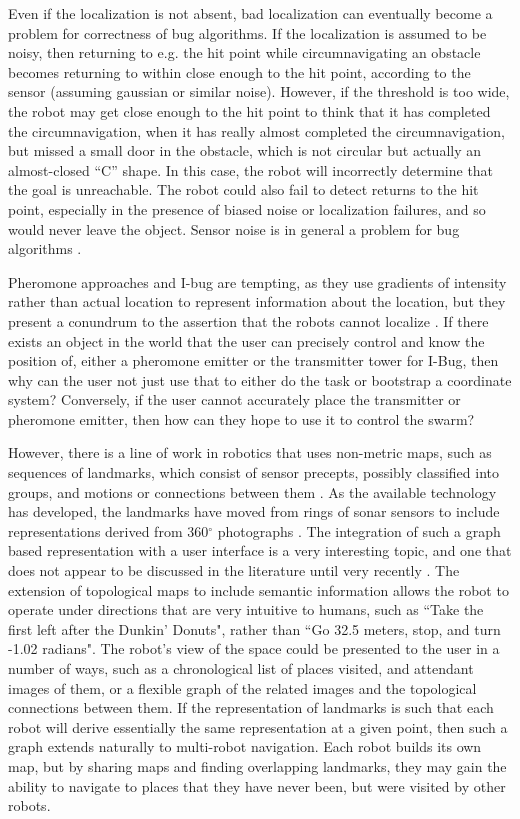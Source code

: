 Even if the localization is not absent, bad localization can eventually become a problem for correctness of bug algorithms. 
If the localization is assumed to be noisy, then returning to e.g. the hit point while circumnavigating an obstacle becomes returning to within close enough to the hit point, according to the sensor (assuming gaussian or similar noise). 
However, if the threshold is too wide, the robot may get close enough to the hit point to think that it has completed the circumnavigation, when it has really almost completed the circumnavigation, but missed a small door in the obstacle, which is not circular but actually an almost-closed ``C'' shape. 
In this case, the robot will incorrectly determine that the goal is unreachable. 
The robot could also fail to detect returns to the hit point, especially in the presence of biased noise or localization failures, and so would never leave the object. 
Sensor noise is in general a problem for bug algorithms \cite{ng2007performance}.

Pheromone approaches and I-bug are tempting, as they use gradients of intensity rather than actual location to represent information about the location, but they present a conundrum to the assertion that the robots cannot localize \citep{taylor2009bug}. 
If there exists an object in the world that the user can precisely control and know the position of, either a pheromone emitter or the transmitter tower for I-Bug, then why can the user not just use that to either do the task or bootstrap a coordinate system?
Conversely, if the user cannot accurately place the transmitter or pheromone emitter, then how can they hope to use it to control the swarm? 

However, there is a line of work in robotics that uses non-metric maps, such as sequences of landmarks, which consist of sensor precepts, possibly classified into groups, and motions or connections between them \citep{mataric1991navigating, franz1998learning}. 
As the available technology has developed, the landmarks have moved from rings of sonar sensors to include representations derived from 360$^\circ$ photographs \citep{tapus2005incremental, goedeme2007omnidirectional}. 
The integration of such a graph based representation with a user interface is a very interesting topic, and one that does not appear to be discussed in the literature until very recently \citep{landsiedel2018semantic}. 
The extension of topological maps to include semantic information allows the robot to operate under directions that are very intuitive to humans, such as ``Take the first left after the Dunkin' Donuts", rather than ``Go 32.5 meters, stop, and turn -1.02 radians".
The robot's view of the space could be presented to the user in a number of ways, such as a chronological list of places visited, and attendant images of them, or a flexible graph of the related images and the topological connections between them. 
If the representation of landmarks is such that each robot will derive essentially the same representation at a given point, then such a graph extends naturally to multi-robot navigation. 
Each robot builds its own map, but by sharing maps and finding overlapping landmarks, they may gain the ability to navigate to places that they have never been, but were visited by other robots. 

